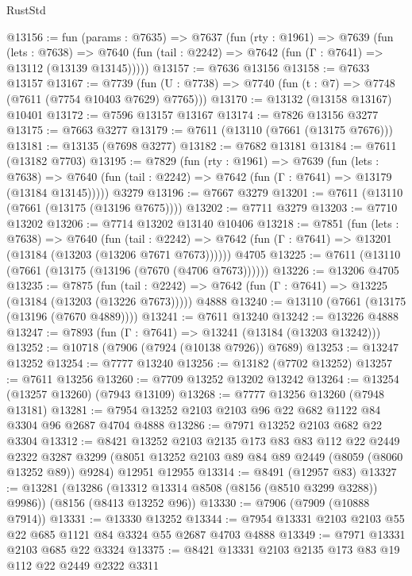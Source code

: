 \begin{lexlean}{RustStd}
\begin{coremodule}
@13156 := fun (params : @7635) =>
  @7637
    (fun (rty : @1961) =>
    @7639
      (fun (lets : @7638) =>
      @7640 (fun (tail : @2242) => @7642 (fun (Γ : @7641) => @13112 (@13139 @13145)))))
@13157 := @7636 @13156
@13158 := @7633 @13157
@13167 := @7739
    (fun (U : @7738) => @7740 (fun (t : @7) => @7748 (@7611 (@7754 @10403 @7629) @7765)))
@13170 := @13132 (@13158 @13167) @10401
@13172 := @7596 @13157 @13167
@13174 := @7826 @13156 @3277
@13175 := @7663 @3277
@13179 := @7611 (@13110 (@7661 (@13175 @7676)))
@13181 := @13135 (@7698 @3277)
@13182 := @7682 @13181
@13184 := @7611 (@13182 @7703)
@13195 := @7829
    (fun (rty : @1961) =>
    @7639
      (fun (lets : @7638) =>
      @7640 (fun (tail : @2242) => @7642 (fun (Γ : @7641) => @13179 (@13184 @13145)))))
    @3279
@13196 := @7667 @3279
@13201 := @7611 (@13110 (@7661 (@13175 (@13196 @7675))))
@13202 := @7711 @3279
@13203 := @7710 @13202
@13206 := @7714 @13202 @13140 @10406
@13218 := @7851
    (fun (lets : @7638) =>
    @7640
      (fun (tail : @2242) =>
      @7642 (fun (Γ : @7641) => @13201 (@13184 (@13203 (@13206 @7671 @7673))))))
    @4705
@13225 := @7611 (@13110 (@7661 (@13175 (@13196 (@7670 (@4706 @7673))))))
@13226 := @13206 @4705
@13235 := @7875
    (fun (tail : @2242) => @7642 (fun (Γ : @7641) => @13225 (@13184 (@13203 (@13226 @7673)))))
    @4888
@13240 := @13110 (@7661 (@13175 (@13196 (@7670 @4889))))
@13241 := @7611 @13240
@13242 := @13226 @4888
@13247 := @7893 (fun (Γ : @7641) => @13241 (@13184 (@13203 @13242)))
@13252 := @10718 (@7906 (@7924 (@10138 @7926)) @7689)
@13253 := @13247 @13252
@13254 := @7777 @13240
@13256 := @13182 (@7702 @13252)
@13257 := @7611 @13256
@13260 := @7709 @13252 @13202 @13242
@13264 := @13254 (@13257 @13260) (@7943 @13109)
@13268 := @7777 @13256 @13260 (@7948 @13181)
@13281 := @7954 @13252 @2103 @2103 @96 @22 @682 @1122 @84 @3304 @96 @2687 @4704 @4888
@13286 := @7971 @13252 @2103 @682 @22 @3304
@13312 := @8421
    @13252
    @2103
    @2135
    @173
    @83
    @83
    @112
    @22
    @2449
    @2322
    @3287
    @3299
    (@8051 @13252 @2103 @89 @84 @89 @2449 (@8059 (@8060 @13252 @89)) @9284)
    @12951
    @12955
@13314 := @8491 (@12957 @83)
@13327 := @13281
    (@13286 (@13312 @13314 @8508 (@8156 (@8510 @3299 @3288)) @9986))
    (@8156 (@8413 @13252 @96))
@13330 := @7906 (@7909 (@10888 @7914))
@13331 := @13330 @13252
@13344 := @7954 @13331 @2103 @2103 @55 @22 @685 @1121 @84 @3324 @55 @2687 @4703 @4888
@13349 := @7971 @13331 @2103 @685 @22 @3324
@13375 := @8421
    @13331
    @2103
    @2135
    @173
    @83
    @19
    @112
    @22
    @2449
    @2322
    @3311

\end{coremodule}
\end{lexlean}

